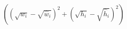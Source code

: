 \documentclass[preview]{standalone}
\begin{document}
\begin{align*}
\left((\sqrt{w_{i}}-\sqrt{\hat{w}_{i}})^{2}+(\sqrt{h_{i}}-\sqrt{\hat{h}_{i}})^{2}\right)
\end{align*}
\end{document}
